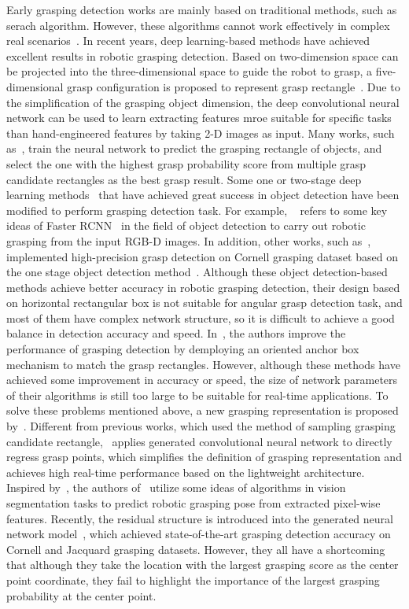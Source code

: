 \documentclass[journal]{IEEEtran}
\begin{document}
Early grasping detection works are mainly based on traditional methods, such as serach algorithm. However, these algorithms cannot work effectively in complex real scenarios~\cite{ft}. In recent years, deep learning-based methods have achieved excellent results in robotic grasping detection. Based on two-dimension space can be projected into the three-dimensional space to guide the robot to grasp, a five-dimensional grasp configuration is proposed to represent grasp rectangle~\cite{lenz}. Due to the simplification of the grasping object dimension, the deep convolutional neural network can be used to learn extracting features mroe suitable for specific tasks than hand-engineered features by taking 2-D images as input. Many works, such as~\cite{Redmon,26_dsgd,acess,KumraK}, train the neural network to predict the grasping rectangle of objects, and select the one with the highest grasp probability score from multiple grasp candidate rectangles as the best grasp result. Some one or two-stage deep learning methods~\cite{yolo9000,ssd,fasterrcnn} that have achieved great success in object detection have been modified to perform grasping detection task. For example, ~\cite{chu} refers to some key ideas of Faster RCNN~\cite{fasterrcnn} in the field of object detection to carry out robotic grasping from the input RGB-D images. In addition, other works, such as~\cite{acess,DBLP}, implemented high-precision grasp detection on Cornell grasping dataset based on the one stage object detection method~\cite{yolo9000,ssd}. Although these object detection-based methods achieve better accuracy in robotic grasping detection, their design based on horizontal rectangular box is not suitable for angular grasp detection task, and most of them have complex network structure, so it is difficult to achieve a good balance in detection accuracy and speed. In~\cite{zhou,song}, the authors improve the performance of grasping detection by demploying an oriented anchor box mechanism to match the grasp rectangles. However, although these methods have achieved some improvement in accuracy or speed, the size of network parameters of their algorithms is still too large to be suitable for real-time applications. To solve these problems mentioned above, a new grasping representation is proposed by~\cite{ggcnn}. Different from previous works, which used the method of sampling grasping candidate rectangle,~\cite{ggcnn} applies generated convolutional neural network to directly regress grasp points, which simplifies the definition of grasping representation and achieves high real-time performance based on the lightweight architecture. Inspired by~\cite{ggcnn}, the authors of~\cite{hri,sgdn} utilize some ideas of algorithms in vision segmentation tasks to predict robotic grasping pose from extracted pixel-wise features. Recently, the residual structure is introduced into the generated neural network model~\cite{kumra}, which achieved state-of-the-art grasping detection accuracy on Cornell and Jacquard grasping datasets. However, they all have a shortcoming that although they take the location with the largest grasping score as the center point coordinate, they fail to highlight the importance of the largest grasping probability at the center point. 
\end{document}
